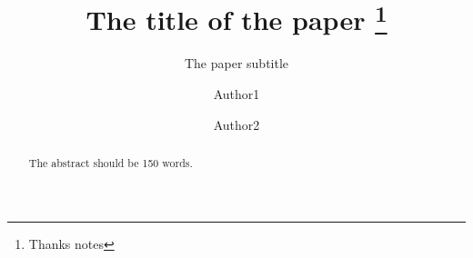 \documentclass[12,letterpaper]{article}
\title{The title of the paper \thanks{Thanks notes}}
\subtitle{The paper subtitle}
\author{Author1 \and Author2}
\institute{University of Washington \and University of Washington}
\date{}
\begin{document}
\maketitle

\begin{abstract}
The abstract should be 150 words.
\end{abstract}

\thispagestyle{empty}
\clearpage


\renewcommand\refname{References}


\end{document}
